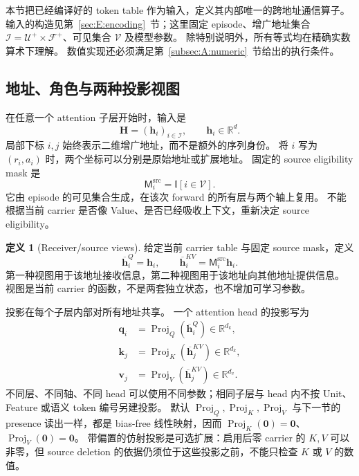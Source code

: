 \documentclass[11pt,UTF8,fontset=fandol]{ctexart}
\numberwithin{equation}{section}
\theoremstyle{definition}
\newtheorem{definition}{定义}[section]
\newcommand{\Rset}{\mathcal U}
\newcommand{\Fset}{\mathcal F}
\newcommand{\Vset}{\mathcal V}
\newcommand{\Iset}{\mathcal I}
\newcommand{\R}{\mathbb R}
\newcommand{\ind}{\mathbb I}
\begin{document}
本节把已经编译好的 token table 作为输入，定义其内部唯一的跨地址通信算子。
输入的构造见第~\ref{sec:E:encoding}~节；这里固定 episode、增广地址集合
$\Iset=\Rset^+\times\Fset^+$、可见集合 $\Vset$ 及模型参数。
除特别说明外，所有等式均在精确实数算术下理解。
数值实现还必须满足第~\ref{subsec:A:numeric}~节给出的执行条件。

\subsection{地址、角色与两种投影视图}
\label{subsec:A:views}

在任意一个 attention 子层开始时，输入是
\begin{equation}
  \bm H=(\bm h_i)_{i\in\Iset},
  \qquad \bm h_i\in\R^d.
  \label{eq:A:input-table}
\end{equation}
局部下标 $i,j$ 始终表示二维增广地址，而不是额外的序列身份。
将 $i$ 写为 $(r_i,a_i)$ 时，两个坐标可以分别是原始地址或扩展地址。
固定的 source eligibility mask 是
\begin{equation}
  \mathsf M_i^{\mathrm{src}}=\ind[i\in\Vset].
  \label{eq:A:source-mask}
\end{equation}
它由 episode 的可见集合生成，在该次 forward 的所有层与两个轴上复用。
不能根据当前 carrier 是否像 Value、是否已经吸收上下文，重新决定 source eligibility。

\begin{definition}[Receiver/source views]
给定当前 carrier table 与固定 source mask，定义
\begin{equation}
  \overline{\bm h}^{Q}_i=\bm h_i,
  \qquad
  \overline{\bm h}^{KV}_i
  =\mathsf M_i^{\mathrm{src}}\bm h_i.
  \label{eq:A:views}
\end{equation}
第一种视图用于该地址接收信息，第二种视图用于该地址向其他地址提供信息。
视图是当前 carrier 的函数，不是两套独立状态，也不增加可学习参数。
\end{definition}

投影在每个子层内部对所有地址共享。
一个 attention head 的投影写为
\begin{equation}
 \begin{aligned}
  \bm q_i&=\operatorname{Proj}_Q(\overline{\bm h}^{Q}_i)\in\R^{d_k},\\
  \bm k_j&=\operatorname{Proj}_K(\overline{\bm h}^{KV}_j)\in\R^{d_k},\\
  \bm v_j&=\operatorname{Proj}_V(\overline{\bm h}^{KV}_j)\in\R^{d_v}.
 \end{aligned}
 \label{eq:A:qkv}
\end{equation}
不同层、不同轴、不同 head 可以使用不同参数；相同子层与 head 内不按 Unit、Feature
或语义 token 编号另建投影。
默认 $\operatorname{Proj}_Q,\operatorname{Proj}_K,\operatorname{Proj}_V$ 与下一节的 presence
读出一样，都是 bias-free 线性映射，因而
$\operatorname{Proj}_K(\bm0)=\bm0$、$\operatorname{Proj}_V(\bm0)=\bm0$。
带偏置的仿射投影是可选扩展：启用后零 carrier 的 $K,V$ 可以非零，但 source deletion
的依据仍须位于这些投影之前，不能只检查 $K$ 或 $V$ 的数值。
\end{document}
